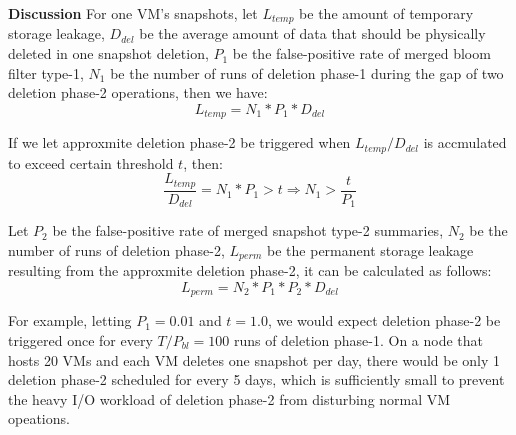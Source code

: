 {\bf Discussion}
For one VM's snapshots, let $L_{temp}$ be the amount of temporary storage leakage, 
$D_{del}$ be the average amount of data that should be physically deleted in one snapshot deletion,
$P_{1}$ be the false-positive rate of merged bloom filter type-1,
$N_1$ be the number of runs of deletion phase-1 during the gap of two deletion phase-2 operations, then we have:
\begin{equation}
L_{temp} = N_1 * P_1 * D_{del}
\end{equation}

If we let approxmite deletion phase-2 be triggered  
when $L_{temp}/D_{del}$ is accmulated to exceed certain threshold $t$, then:
\begin{equation}
\frac{L_{temp}}{D_{del}} = N_1 * P_1 > t \Rightarrow N_{1} > \frac{t}{P_1}
\end{equation}

Let $P_2$ be the false-positive rate of merged snapshot type-2 summaries,
$N_2$ be the number of runs of deletion phase-2,
$L_{perm}$ be the permanent storage leakage resulting from the approxmite deletion phase-2,
it can be calculated as follows: 
\begin{equation}
L_{perm} = N_2 * P_1 * P_2 * D_{del}
\end{equation}

For example, letting $P_1 = 0.01$ and $t=1.0$, 
we would expect deletion phase-2 be triggered once for 
every $T/P_{bl} = 100$ runs of deletion phase-1.
On a node that hosts 20 VMs and each VM deletes one snapshot per day, there would be 
only 1 deletion phase-2 scheduled for every 5 days, which is sufficiently small to prevent the 
heavy I/O workload of deletion phase-2 from disturbing normal VM opeations.

